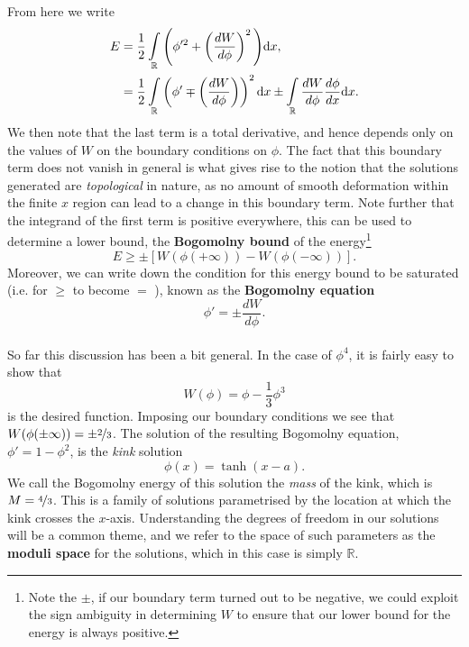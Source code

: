\documentclass[11pt, fleqn]{article}
\begin{document}
From here we write
	\begin{align*}
		E
		&= \frac{1}{2} \mathop{\mathlarger{\int}}_\mathbb{R} \Bigg( \phi'^2 + \left( \frac{d W}{d \phi} \right)^2 \Bigg) \mathrm{d} x, \\
		&= 	\frac{1}{2} \mathop{\mathlarger{\int}}_\mathbb{R} \left( \phi' \mp \left( \frac{d W}{d \phi} \right) \right)^2 \mathrm{d}x
		\pm \mathop{\mathlarger{\int}}_\mathbb{R} \frac{dW}{d \phi} \frac{d \phi}{dx} \mathrm{d}x.
 	\end{align*}
We then note that the last term is a total derivative, and hence depends only on the values of $ W $ on the boundary conditions on $ \phi $. The fact that this boundary term does not vanish in general is what gives rise to the notion that the solutions generated are \textit{topological} in nature, as no amount of smooth deformation within the finite $ x $ region can lead to a change in this boundary term. Note further that the integrand of the first term is positive everywhere, this can be used to determine a lower bound, the \textbf{Bogomolny bound} of the energy\footnote{Note the $ \pm $, if our boundary term turned out to be negative, we could exploit the sign ambiguity in determining $ W $ to ensure that our lower bound for the energy is always positive.}
	\begin{equation}\label{key}
		E \geq \pm \left[ W ( \phi ( + \infty)) - W ( \phi ( - \infty)) \right].
	\end{equation}
Moreover, we can write down the condition for this energy bound to be saturated (i.e. for $ \geq $ to become $ = $ ), known as the \textbf{Bogomolny equation}
	\begin{equation}\label{key}
		\phi' = \pm \frac{d W}{d \phi}.
	\end{equation}

\paragraph{} So far this discussion has been a bit general. In the case of $ \phi^4 $, it is fairly easy to show that
	\begin{equation}
		W(\phi) = \phi - \frac{1}{3} \phi^3
	\end{equation}
is the desired function. Imposing our boundary conditions we see that $ W(\phi(\pm \infty)) = \pm \nicefrac{2}{3} $. The solution of the resulting Bogomolny equation, $ \phi' = 1 - \phi^2 $, is the \textit{kink} solution 
\begin{equation}
	\phi(x) = \tanh (x-a).
\end{equation}
We call the Bogomolny energy of this solution the \textit{mass} of the kink, which is $ {M = \nicefrac{4}{3}} $.  This is a family of solutions parametrised by the location at which the kink crosses the $ x $-axis. Understanding the degrees of freedom in our solutions will be a common theme, and we refer to the space of such parameters as the \textbf{moduli space} for the solutions, which in this case is simply $ \mathbb{R} $.
\end{document}
